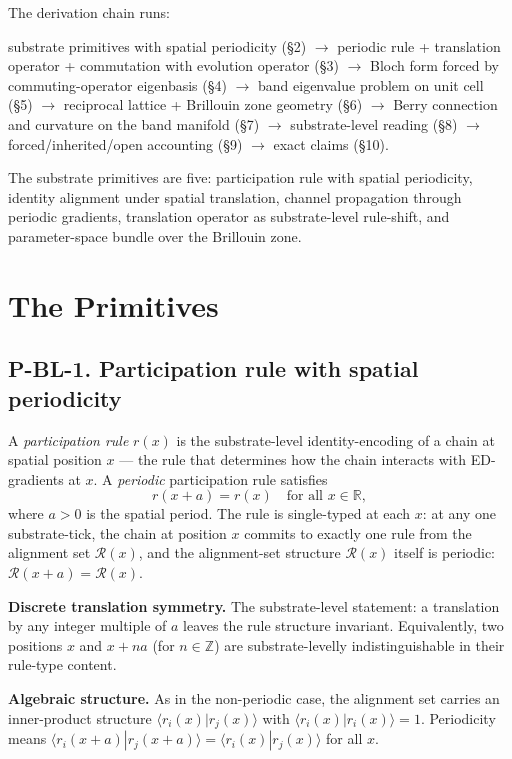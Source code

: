 \documentclass[11pt,a4paper]{article}
\begin{document}
The derivation chain runs:

substrate primitives with spatial periodicity (\S2) $\to$ periodic rule + translation operator + commutation with evolution operator (\S3) $\to$ Bloch form forced by commuting-operator eigenbasis (\S4) $\to$ band eigenvalue problem on unit cell (\S5) $\to$ reciprocal lattice + Brillouin zone geometry (\S6) $\to$ Berry connection and curvature on the band manifold (\S7) $\to$ substrate-level reading (\S8) $\to$ forced/inherited/open accounting (\S9) $\to$ exact claims (\S10).

The substrate primitives are five: participation rule with spatial periodicity, identity alignment under spatial translation, channel propagation through periodic gradients, translation operator as substrate-level rule-shift, and parameter-space bundle over the Brillouin zone.

\section{The Primitives}

\subsection{P-BL-1. Participation rule with spatial periodicity}

A \emph{participation rule} $r(x)$ is the substrate-level identity-encoding of a chain at spatial position $x$ --- the rule that determines how the chain interacts with ED-gradients at $x$. A \emph{periodic} participation rule satisfies
\[
r(x + a) = r(x) \quad \text{for all } x \in \mathbb{R},
\]
where $a > 0$ is the spatial period. The rule is single-typed at each $x$: at any one substrate-tick, the chain at position $x$ commits to exactly one rule from the alignment set $\mathcal{R}(x)$, and the alignment-set structure $\mathcal{R}(x)$ itself is periodic: $\mathcal{R}(x + a) = \mathcal{R}(x)$.

\textbf{Discrete translation symmetry.} The substrate-level statement: a translation by any integer multiple of $a$ leaves the rule structure invariant. Equivalently, two positions $x$ and $x + na$ (for $n \in \mathbb{Z}$) are substrate-levelly indistinguishable in their rule-type content.

\textbf{Algebraic structure.} As in the non-periodic case, the alignment set carries an inner-product structure $\langle r_i(x)|r_j(x)\rangle$ with $\langle r_i(x)|r_i(x)\rangle = 1$. Periodicity means $\langle r_i(x+a)|r_j(x+a)\rangle = \langle r_i(x)|r_j(x)\rangle$ for all $x$.
\end{document}
